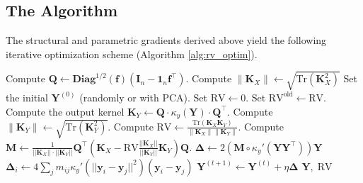 \documentclass[11pt]{article}
\begin{document}
	
	\subsection{The Algorithm}
	
	The structural and parametric gradients derived above yield the following iterative optimization scheme (Algorithm \ref{alg:rv_optim}).
	
	\begin{algorithm}[h]
		\caption{RV dimensionality reduction \\
			\textbf{Inputs:} The target $\mathbf{K}_X$, the weights $\mathbf{f}$, dimension $q$, the output kernel function $\kappa_y(\mathbf{y}_i, \mathbf{y}_j)$, the learning rate $\eta$, the convergence threshold $\epsilon$. \\
			\textbf{Outputs:} The $n \times q$ matrix of centered coordinates $\mathbf{Y}$, the final RV coefficient.}
		\label{alg:rv_optim}
		\begin{algorithmic}[1]
			\STATE Compute $\mathbf{Q} \leftarrow \textbf{Diag}^{1/2}(\mathbf{f}) (\mathbf{I}_n - \mathbf{1}_n \mathbf{f}^\top)$.
			\STATE Compute $ \| \mathbf{K}_X \| \leftarrow \sqrt{\text{Tr}(\mathbf{K}_X^2)}$
			\STATE Set the initial $\mathbf{Y}^{(0)}$ (randomly or with PCA).
			\STATE Set $\text{RV} \leftarrow 0$.
			\REPEAT
			\STATE Set $\text{RV}^\text{old} \leftarrow \text{RV}$.
			\STATE Compute the output kernel $\mathbf{K}_Y \leftarrow \mathbf{Q} \cdot  \kappa_y(\mathbf{Y}) \cdot \mathbf{Q}^\top$.
			\STATE Compute $ \| \mathbf{K}_Y \| \leftarrow \sqrt{\text{Tr}(\mathbf{K}_Y^2)}$.
			\STATE Compute $\text{RV} \leftarrow \frac{\text{Tr}(\mathbf{K}_X \mathbf{K}_Y)}{\| \mathbf{K}_X \| \| \mathbf{K}_Y \|}$.
			\STATE Compute $\mathbf{M} \leftarrow \frac{1}{||\mathbf{K}_X|| \cdot ||\mathbf{K}_Y||} \mathbf{Q}^\top \left( \mathbf{K}_X - \text{RV} \frac{||\mathbf{K}_X||}{||\mathbf{K}_Y||} \mathbf{K}_Y \right) \mathbf{Q}$.
			\STATE $\bm{\Delta} \leftarrow 2 \left( \mathbf{M} \circ \kappa_y'(\mathbf{Y}\mathbf{Y}^\top) \right) \mathbf{Y}$
			\STATE $\bm{\Delta}_i \leftarrow 4 \sum_j m_{ij} \kappa_y'(||\mathbf{y}_i - \mathbf{y}_j||^2) (\mathbf{y}_i - \mathbf{y}_j)$
			\ENDIF
			\STATE $\mathbf{Y}^{(t+1)} \leftarrow \mathbf{Y}^{(t)} + \eta \bm{\Delta}$
			\RETURN $\mathbf{Y},\; \text{RV}$
		\end{algorithmic}
	\end{algorithm}
	
\end{document}
